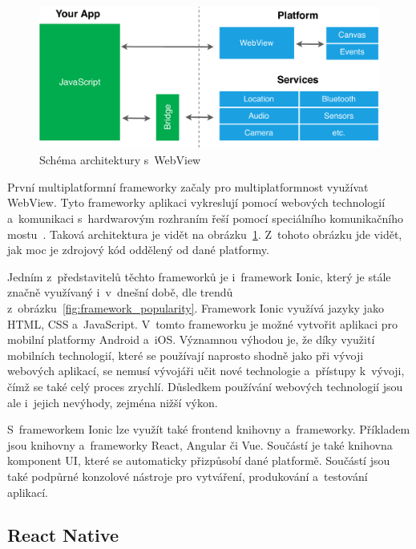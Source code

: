\begin{figure}
    \centering
    \includegraphics[width=\linewidth]{assets/technology-research/framework/webview.pdf}
    \caption{Schéma architektury s~WebView~\cite{hackernoon_flutter}}
    \label{fig:framework_webview}
\end{figure}

První multiplatformní frameworky začaly pro multiplatformnost využívat
\linebreak WebView.
Tyto frameworky aplikaci vykreslují pomocí webových technologií
a~komunikaci s~hardwarovým rozhraním řeší pomocí speciálního komunikačního
mostu~\cite{hackernoon_flutter}.
Taková architektura je vidět na obrázku~\ref{fig:framework_webview}.
Z~tohoto obrázku jde vidět,
jak moc je zdrojový kód oddělený od dané platformy.

Jedním z~představitelů těchto frameworků je i~framework Ionic,
který je stále značně využívaný i~v~dnešní době,
dle trendů z~obrázku~\ref{fig:framework_popularity}.
Framework Ionic využívá jazyky jako HTML, CSS a~JavaScript.
V~tomto frameworku je možné vytvořit aplikaci pro mobilní platformy
Android a~iOS.
Významnou výhodou je,
že díky využití mobilních technologií,
které se používají naprosto shodně jako při vývoji webových aplikací,
se nemusí vývojáři učit nové technologie a~přístupy k~vývoji,
čímž se také celý proces zrychlí.
Důsledkem používání webových technologií jsou ale i~jejich nevýhody,
zejména nižší výkon.~\cite{dashmagazine_mobile_frameworks}

S~frameworkem Ionic lze využít také frontend knihovny a~frameworky.
Příkladem jsou knihovny a~frameworky React, Angular či Vue.
Součástí je také knihovna komponent UI,
které se automaticky přizpůsobí dané platformě.
Součástí jsou také podpůrné konzolové nástroje pro vytváření, produkování
a~testování aplikací.~\cite{ionic}

\subsection{React Native}

